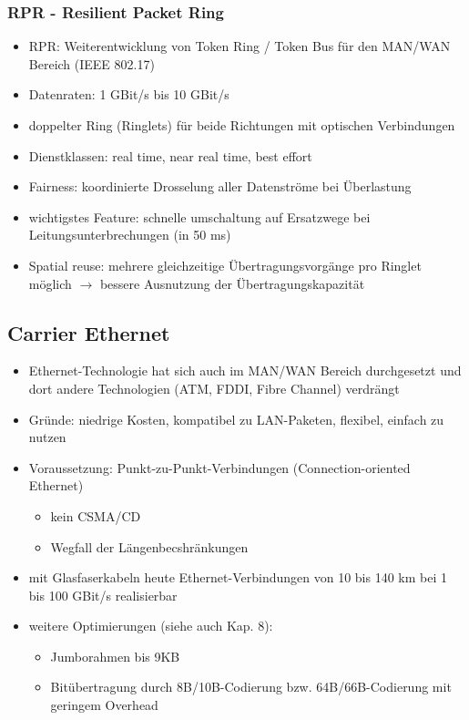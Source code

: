 \subsubsection{RPR - Resilient Packet Ring}
\begin{itemize}
	\item RPR: Weiterentwicklung von Token Ring / Token Bus für den MAN/WAN Bereich (IEEE 802.17)
	\item Datenraten: 1 GBit/s bis 10 GBit/s
	\item doppelter Ring (Ringlets) für beide Richtungen mit optischen Verbindungen 
	\item Dienstklassen: real time, near real time, best effort
	\item Fairness: koordinierte Drosselung aller Datenströme bei Überlastung
	\item wichtigstes Feature: schnelle umschaltung auf Ersatzwege bei Leitungsunterbrechungen (in 50 ms)
	\item Spatial reuse: mehrere gleichzeitige Übertragungsvorgänge pro Ringlet möglich \(\to\) bessere Ausnutzung der Übertragungskapazität
\end{itemize}
\subsection{Carrier Ethernet}
\begin{itemize}
	\item Ethernet-Technologie hat sich auch im MAN/WAN Bereich durchgesetzt und dort andere Technologien (ATM, FDDI, Fibre Channel) verdrängt
	\item Gründe: niedrige Kosten, kompatibel zu LAN-Paketen, flexibel, einfach zu nutzen
	\item Voraussetzung: Punkt-zu-Punkt-Verbindungen (Connection-oriented Ethernet)
	\begin{itemize}
		\item kein CSMA/CD
		\item Wegfall der Längenbecshränkungen
	\end{itemize}
	\item mit Glasfaserkabeln heute Ethernet-Verbindungen von 10 bis 140 km bei 1 bis 100 GBit/s realisierbar
	\item weitere Optimierungen (siehe auch Kap. 8):
	\begin{itemize}
		\item Jumborahmen bis 9KB
		\item Bitübertragung durch 8B/10B-Codierung bzw. 64B/66B-Codierung mit geringem Overhead
	\end{itemize}
\end{itemize}
